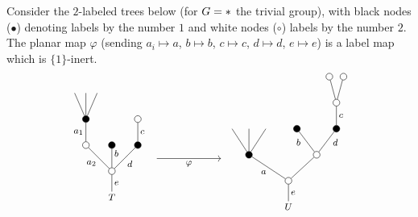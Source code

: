 \documentclass[a4paper,10pt]{article}%
\begin{document}
\begin{example}\label{LABELEDTREES EX}
Consider the $2$-labeled trees below (for $G=\**$ the trivial group), with black nodes ($\bullet$) denoting labels by the number $1$ and white nodes ($\circ$) labels by the number $2$.
The planar map $\varphi$ (sending $a_i\mapsto a$, 
$b \mapsto b$, $c \mapsto c$, $d \mapsto d$, $e \mapsto e$) is a label map which is $\{1\}$-inert.
\[
	\begin{tikzpicture}[grow=up,auto,level distance=2.1em,
	every node/.style = {font=\footnotesize,inner sep=2pt},
	dummy/.style={circle,draw,inner sep=0pt,
	minimum size=2.1mm}]
	\begin{scope}[level distance=2.3em]
	\tikzstyle{level 2}=[sibling distance=3.5em]%
	\tikzstyle{level 3}=[sibling distance=2.25em]%
	\tikzstyle{level 4}=[sibling distance=1.25em]%
	\tikzstyle{level 5}=[sibling distance=1.25em]%
		\node at (5.5,0) {$U$}
			child{node [dummy] {}
				child[sibling distance =5em]{node [dummy] {}
					child[sibling distance =3.5em]{node [dummy,fill=black] {}
						child{node [dummy] {}
							child{node [dummy] {}}
							child{node [dummy] {}}
						edge from parent node [swap] {$c$}}
					edge from parent node [swap, near end] {$d$}}
					child[sibling distance =3.5em]{node [dummy,fill=black] {}
					edge from parent node [near end] {$b$}}
				}
				child[sibling distance =7em]{node [dummy,fill=black] {}
					child[sibling distance =1.5em]
					child[sibling distance =1.5em]
					child[sibling distance =1.5em]
				edge from parent node {$a$}}
			edge from parent node [swap] {$e$}};
	\end{scope}
	\begin{scope}[level distance=2.3em]
	\tikzstyle{level 2}=[sibling distance=2.3em]%
	\tikzstyle{level 4}=[sibling distance=1em]%
		\node at (0,0.3) {$T$}
			child{node [dummy] {}
				child{node [dummy,fill=black] {}
					child{node [dummy] {}
					edge from parent node [swap] {$c$}}	
				edge from parent node [swap] {$d$}}
				child{node [dummy,fill=black] {}
				edge from parent node [near end,swap] {$b$}}
				child{node [dummy] {}
					child{node [dummy,fill=black] {}
						child
						child
						child
					edge from parent node {$a_1$}}
				edge from parent node {$a_2$}}
			edge from parent node [swap] {$e$}};
	\end{scope}
	\draw [->] (1.4,1.5) -- node[swap] {$\varphi$} (3.4,1.5);
	\end{tikzpicture}
\]
\end{example}
\end{document}
